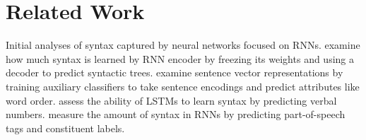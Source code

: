 \documentclass[11pt,a4paper]{article}
\begin{document}
%


\section{Related Work}
\label{sec:related-work}
Initial analyses of syntax captured by neural networks focused on RNNs.
\citet{shi:padhi:knight:2016} examine how much syntax is learned by RNN encoder by freezing
its
weights and using a decoder to predict syntactic trees.
\citet{adi:2016} examine sentence vector representations by training auxiliary classifiers to take sentence encodings and predict attributes like word order.
\citet{linzen2016assessing} assess the ability of LSTMs to learn syntax by predicting verbal numbers. 
\citet{blevins-levy-zettlemoyer:2018} measure the amount of syntax in RNNs by predicting part-of-speech tags and constituent labels.
\end{document}

